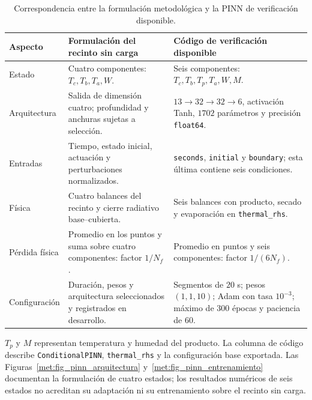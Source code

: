 \begin{table}[p]
\centering
\caption{Correspondencia entre la formulación metodológica y la PINN de verificación disponible.}
\label{res:tabla_pinn_correspondencia}
\begingroup
\small
\setlength{\tabcolsep}{4pt}
\renewcommand{\arraystretch}{1.12}
\begin{tabularx}{\textwidth}{@{}>{\raggedright\arraybackslash}p{}>{\raggedright\arraybackslash}X>{\raggedright\arraybackslash}X@{}}
\toprule
Aspecto & Formulación del recinto sin carga & Código de verificación disponible \\
\midrule
Estado & Cuatro componentes: $T_c,T_b,T_a,W$. & Seis componentes: $T_c,T_b,T_p,T_a,W,M$. \\
Arquitectura & Salida de dimensión cuatro; profundidad y anchuras sujetas a selección. & $13\to32\to32\to6$, activación Tanh, $1702$ parámetros y precisión \texttt{float64}. \\
Entradas & Tiempo, estado inicial, actuación y perturbaciones normalizados. & \texttt{seconds}, \texttt{initial} y \texttt{boundary}; esta última contiene seis condiciones. \\
Física & Cuatro balances del recinto y cierre radiativo base--cubierta. & Seis balances con producto, secado y evaporación en \texttt{thermal\_rhs}. \\
Pérdida física & Promedio en los puntos y suma sobre cuatro componentes: factor $1/N_f$. & Promedio en puntos y seis componentes: factor $1/(6N_f)$. \\
Configuración & Duración, pesos y arquitectura seleccionados y registrados en desarrollo. & Segmentos de $20$ s; pesos $(1,1,10)$; Adam con tasa $10^{-3}$; máximo de $300$ épocas y paciencia de $60$. \\
\bottomrule
\end{tabularx}
\endgroup
\par\smallskip
\begin{minipage}{\textwidth}\footnotesize
$T_p$ y $M$ representan temperatura y humedad del producto. La columna de código describe \texttt{ConditionalPINN}, \texttt{thermal\_rhs} y la configuración base exportada. Las Figuras~\ref{met:fig_pinn_arquitectura} y~\ref{met:fig_pinn_entrenamiento} documentan la formulación de cuatro estados; los resultados numéricos de seis estados no acreditan su adaptación ni su entrenamiento sobre el recinto sin carga.
\end{minipage}
\end{table}

